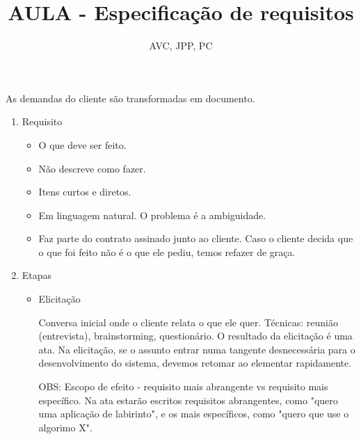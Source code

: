 \documentclass[
	12pt, %
]{fphw}
\title{AULA - Especificação de requisitos} %
\author{AVC, JPP, PC} %
\date{} %
\institute{Pontifícia Universidade Católica do Rio de Janeiro \\ Departamento de Informática} %
\begin{document}
\maketitle %

\begin{doublespace}

As demandas do cliente são transformadas em documento.

\begin{enumerate}

    \item Requisito
    
    \begin{itemize}

        \item O que deve ser feito.
        \item Não descreve como fazer.
        \item Itens curtos e diretos.
        \item Em linguagem natural. O problema é a ambiguidade.
        \item Faz parte do contrato assinado junto ao cliente. Caso o cliente decida que o que foi feito não é o que ele pediu, temos refazer de graça.
        
    \end{itemize}

    \item Etapas
    
    \begin{itemize}

        \item Elicitação
        
        Conversa inicial onde o cliente relata o que ele quer. Técnicas: reunião (entrevista), brainstorming, questionário. O resultado da elicitação é uma ata. Na elicitação, se o assunto entrar numa tangente desnecessária para o desenvolvimento do sistema, devemos retomar ao elementar rapidamente.
        
        OBS: Escopo de efeito - requisito mais abrangente vs requisito mais específico. Na ata estarão escritos requisitos abrangentes, como "quero uma aplicação de labirinto", e os mais específicos, como "quero que use o algorimo X".


\end{itemize}
\end{enumerate}
\end{doublespace}
\end{document}
